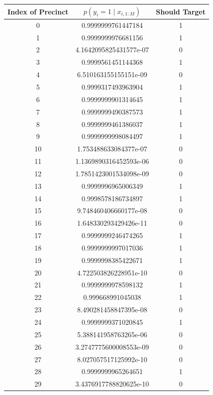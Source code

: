\documentclass[12pt]{article}
\begin{document}
\begin{enumerate}[label=(\Alph*)]
		\begin{table}
			\small
			\centering
			\begin{tabular}{ |c|c|c| } 
				\hline
			    Index of Precinct & $p(y_{i} = 1 \mid x_{i, 1:M})$ & Should Target \\
				 \hline
				  0 & 0.9999999761447184 & 1 \\
					1 & 0.9999999976681156 & 1 \\
					2 & 4.1642095825431577e-07 & 0 \\
					3 & 0.9999561451144368 & 1 \\
					4 & 6.510163155155151e-09 & 0 \\
					5 & 0.9999317493963904 & 1 \\
					6 & 0.9999999901314645 & 1 \\
					7 & 0.9999999490387573 & 1 \\
					8 & 0.9999999461386037 & 1 \\
					9 & 0.9999999998084497 & 1 \\
					10 &  1.753488633084377e-07 & 0 \\
					11 &  1.1369890316452593e-06 & 0 \\
					12 &  1.7851423001534098e-09 & 0 \\
					13 &  0.9999996965006349 & 1 \\
					14 &  0.9998578186734897 & 1 \\
					15 &  9.748460406660177e-08 & 0 \\
					16 &  1.648330293429426e-11 & 0 \\
					17 &  0.9999999246474265 & 1 \\
					18 &  0.9999999997017036 & 1 \\
					19 &  0.9999998385422671 & 1 \\
					20 &  4.722503826228951e-10 & 0 \\
					21 &  0.9999999978598132 & 1 \\
					22 &  0.999668991045038 & 1 \\
					23 &  8.490281458847395e-08 & 0 \\
					24 &  0.9999999371020845 & 1 \\
					25 &  5.388141958763265e-06 & 0 \\
					26 &  3.2747775600008553e-09 & 0 \\
					27 &  8.027057517125992e-10 & 0 \\
					28 &  0.9999999965264651 & 1 \\
					29 &  3.4376917788820625e-10 & 0 \\

\end{tabular}
\end{table}
\end{enumerate}
\end{document}
